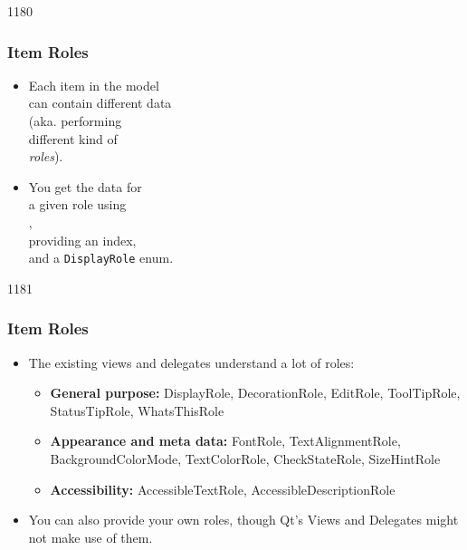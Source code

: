 \begin{slide}{1180}\frametitle{Item Roles}\label{itemRoles}
\begin{itemize}
\item Each item in the model\\
  can contain different data\\
  (aka. performing\\
  different kind of\\
  \emph{roles}).
\item You get the data for\\
  a given role using\\
  ,\\
  providing an index,\\
  and a \texttt{DisplayRole} enum.
\end{itemize}
\end{slide}

\begin{slide}{1181}\frametitle{Item Roles}
\begin{itemize}
\item The existing views and delegates understand a lot of roles:
  \begin{itemize}
  \item \textbf{General purpose:} DisplayRole, DecorationRole,
    EditRole, ToolTipRole, StatusTipRole, WhatsThisRole
  \item \textbf{Appearance and meta data:} FontRole, TextAlignmentRole,
    BackgroundColorMode, TextColorRole, CheckStateRole, SizeHintRole
  \item \textbf{Accessibility:} AccessibleTextRole, AccessibleDescriptionRole
  \end{itemize}
\item You can also provide your own roles, though Qt's Views and Delegates
  might not make use of them.
\end{itemize}
\end{slide}

